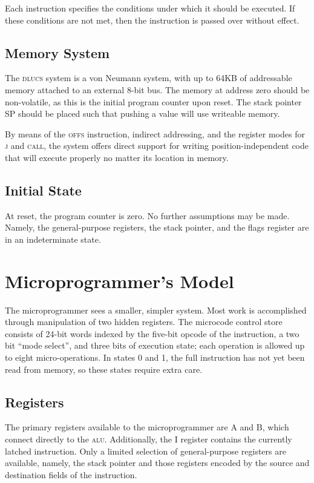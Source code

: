 \documentclass[11pt]{book}
\begin{document}
Each instruction specifies the conditions
under which it should be executed.
If these conditions are not met,
then the instruction is passed over without effect.

\subsection{Memory System}
The \textsc{dlucs} system is a von Neumann system,
with up to 64KB of addressable memory
attached to an external 8-bit bus.
The memory at address zero should be non-volatile,
as this is the initial program counter upon reset.
The stack pointer SP should be placed
such that pushing a value will use writeable memory.

By means of the \textsc{offs} instruction,
indirect addressing, and
the register modes for \textsc{j} and \textsc{call},
the system offers direct support
for writing position-independent code
that will execute properly no matter its location in memory.

\subsection{Initial State}
At reset, the program counter is zero.
No further assumptions may be made.
Namely, the general-purpose registers,
the stack pointer,
and the flags register are in an indeterminate state.

\section{Microprogrammer's Model}
The micro\-programmer sees a smaller, simpler system.
Most work is accomplished through manipulation of two hidden registers.
The microcode control store consists of
24-bit words indexed by the five-bit opcode of the instruction,
a two bit ``mode select'',
and three bits of execution state;
each operation is allowed up to eight micro-operations.
In states 0 and 1, the full instruction has not yet been read
from memory, so these states require extra care.

\subsection{Registers}
The primary registers available to the micro\-programmer are
A and B, which connect directly to the \textsc{alu}.
Additionally, the I register contains the currently latched instruction.
Only a limited selection of general-purpose registers are available,
namely, the stack pointer
and those registers encoded by the source and destination fields
of the instruction.
\end{document}
